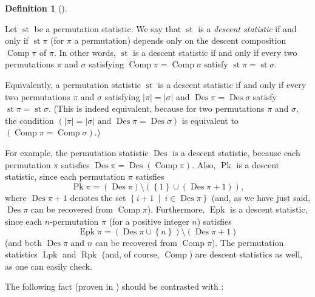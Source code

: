 \documentclass[numbers=enddot,12pt,final,onecolumn,notitlepage]{scrartcl}%
\theoremstyle{definition}
\newtheorem{defi}[theo]{Definition}
\newenvironment{definition}[1][]
{\begin{defi}[#1]\begin{leftbar}}
{\end{leftbar}\end{defi}}
\newenvironment{vershort}{}{}
\begin{document}
\begin{definition}
Let $\operatorname*{st}$ be a permutation statistic. We say that
$\operatorname*{st}$ is a \textit{descent statistic} if and only if
$\operatorname*{st}\pi$ (for $\pi$ a permutation) depends only on the descent
composition $\operatorname*{Comp}\pi$ of $\pi$. In other words,
$\operatorname*{st}$ is a descent statistic if and only if every two
permutations $\pi$ and $\sigma$ satisfying $\operatorname*{Comp}%
\pi=\operatorname*{Comp}\sigma$ satisfy $\operatorname*{st}\pi
=\operatorname*{st}\sigma$.
\end{definition}

Equivalently, a permutation statistic $\operatorname*{st}$ is a descent
statistic if and only if every two permutations $\pi$ and $\sigma$ satisfying
$\left\vert \pi\right\vert =\left\vert \sigma\right\vert $ and
$\operatorname*{Des}\pi=\operatorname*{Des}\sigma$ satisfy $\operatorname*{st}%
\pi=\operatorname*{st}\sigma$. (This is indeed equivalent, because for two
permutations $\pi$ and $\sigma$, the condition $\left(  \left\vert
\pi\right\vert =\left\vert \sigma\right\vert \text{ and }\operatorname*{Des}%
\pi=\operatorname*{Des}\sigma\right)  $ is equivalent to $\left(
\operatorname*{Comp}\pi=\operatorname*{Comp}\sigma\right)  $.)

For example, the permutation statistic $\operatorname*{Des}$ is a descent
statistic, because each permutation $\pi$ satisfies $\operatorname*{Des}%
\pi=\operatorname*{Des}\left(  \operatorname*{Comp}\pi\right)  $. Also,
$\operatorname*{Pk}$ is a descent statistic, since each permutation $\pi$
satisfies%
\[
\operatorname*{Pk}\pi=\left(  \operatorname*{Des}\pi\right)  \setminus\left(
\left\{  1\right\}  \cup\left(  \operatorname*{Des}\pi+1\right)  \right)  ,
\]
where $\operatorname*{Des}\pi+1$ denotes the set $\left\{  i+1\ \mid
\ i\in\operatorname*{Des}\pi\right\}  $ (and, as we have just said,
$\operatorname*{Des}\pi$ can be recovered from $\operatorname*{Comp}\pi$).
Furthermore, $\operatorname*{Epk}$ is a descent statistic, since each
$n$-permutation $\pi$ (for a positive integer $n$) satisfies%
\[
\operatorname*{Epk}\pi=\left(  \operatorname*{Des}\pi\cup\left\{  n\right\}
\right)  \setminus\left(  \operatorname*{Des}\pi+1\right)
\]
(and both $\operatorname*{Des}\pi$ and $n$ can be recovered from
$\operatorname*{Comp}\pi$). The permutation statistics $\operatorname*{Lpk}$
and $\operatorname*{Rpk}$ (and, of course, $\operatorname*{Comp}$) are descent
statistics as well, as one can easily check.

\begin{vershort}
The following fact (proven in \cite{verlong}) should be contrasted with
\cite[Conjecture 6.11]{part1}:
\end{vershort}
\end{document}
